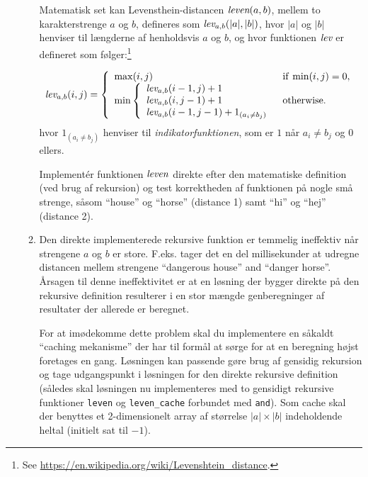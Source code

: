 \documentclass[a4paper,12pt]{article}
\newcommand{\id}[1]{\ensuremath{\emph{#1}}}
\begin{document}
\begin{enumerate}[label=8i.\arabic*,start=0]
\begin{enumerate}[label=8i.\arabic*,start=3]
  Matematisk set kan Levensthein-distancen $\id{leven}(a,b)$, mellem
  to karakterstrenge $a$ og $b$, defineres som
  $\id{lev}_{a,b}(|a|,|b|)$, hvor $|a|$ og $|b|$ henviser til
  længderne af henholdsvis $a$ og $b$, og hvor funktionen $\id{lev}$ er
  defineret som følger:\footnote{See
    \url{https://en.wikipedia.org/wiki/Levenshtein_distance}.}

  \[
  \id{lev}_{a,b}(i,j) = \left \{ \begin{array}{ll} \mathrm{max}(i,j) & \mathrm{if}~\mathrm{min}(i,j) = 0, \\
    \mathrm{min} \left \{ \begin{array}{l}\id{lev}_{a,b}(i-1,j)+1 \\
                                          \id{lev}_{a,b}(i,j-1)+1 \\
                                          \id{lev}_{a,b}(i-1,j-1)+1_{(a_i\not=b_j)} \end{array} \right . & \mathrm{otherwise}. \end{array} \right .
  \]
  hvor $1_{(a_i\not=b_j)}$ henviser til \emph{indikatorfunktionen}, som er $1$ når $a_i\not=b_j$ og $0$ ellers.

  Implement\'{e}r funktionen \id{leven} direkte efter den matematiske
  definition (ved brug af rekursion) og test korrektheden af funktionen på nogle små
  strenge, såsom ``house'' og ``horse'' (distance 1) samt ``hi'' og ``hej'' (distance 2).

  \item Den direkte implementerede rekursive funktion er temmelig
    ineffektiv når strengene $a$ og $b$ er store. F.eks. tager det en
    del millisekunder at udregne distancen mellem strengene
    ``dangerous house'' and ``danger horse''. Årsagen til denne
    ineffektivitet er at en løsning der bygger direkte på den
    rekursive definition resulterer i en stor mængde genberegninger af
    resultater der allerede er beregnet.

    For at imødekomme dette problem skal du implementere en såkaldt
    ``caching mekanisme'' der har til formål at sørge for at en
    beregning højst foretages en gang.  Løsningen kan passende gøre
    brug af gensidig rekursion og tage udgangspunkt i løsningen for
    den direkte rekursive definition (således skal løsningen nu
    implementeres med to gensidigt rekursive funktioner \lstinline{leven} og \lstinline{leven_cache} forbundet med
    \lstinline{and}). Som cache skal der benyttes et 2-dimensionelt
    array af størrelse $|a|\times|b|$ indeholdende heltal (initielt
    sat til $-1$).


\end{enumerate}
\end{enumerate}
\end{document}
